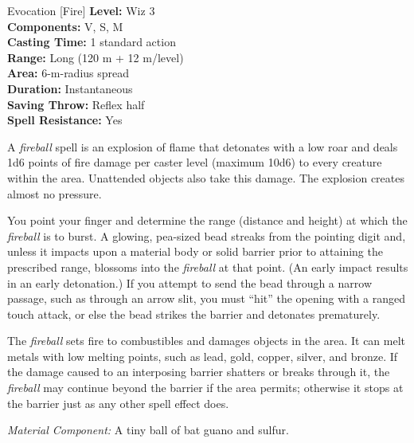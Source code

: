 {Evocation [Fire]}
{
	\textbf{Level:}
	Wiz 3\\
	\textbf{Components:}
	V, S, M\\
	\textbf{Casting Time:}
	1 standard action\\
	\textbf{Range:}
	Long (120 m + 12 m/level)\\
	\textbf{Area:}
	6-m-radius spread\\
	\textbf{Duration:}
	Instantaneous\\
	\textbf{Saving Throw:}
	Reflex half\\
	\textbf{Spell Resistance:}
	Yes\\
}
{
	A \emph{fireball} spell is an explosion of flame that detonates with a low roar and deals 1d6 points of fire damage per caster level (maximum 10d6) to every creature within the area. Unattended objects also take this damage. The explosion creates almost no pressure.

	You point your finger and determine the range (distance and height) at which the \emph{fireball} is to burst. A glowing, pea-sized bead streaks from the pointing digit and, unless it impacts upon a material body or solid barrier prior to attaining the prescribed range, blossoms into the \emph{fireball} at that point. (An early impact results in an early detonation.) If you attempt to send the bead through a narrow passage, such as through an arrow slit, you must ``hit'' the opening with a ranged touch attack, or else the bead strikes the barrier and detonates prematurely.

	The \emph{fireball} sets fire to combustibles and damages objects in the area. It can melt metals with low melting points, such as lead, gold, copper, silver, and bronze. If the damage caused to an interposing barrier shatters or breaks through it, the \emph{fireball} may continue beyond the barrier if the area permits; otherwise it stops at the barrier just as any other spell effect does.

	\textit{Material Component:}
	A tiny ball of bat guano and sulfur.

}
